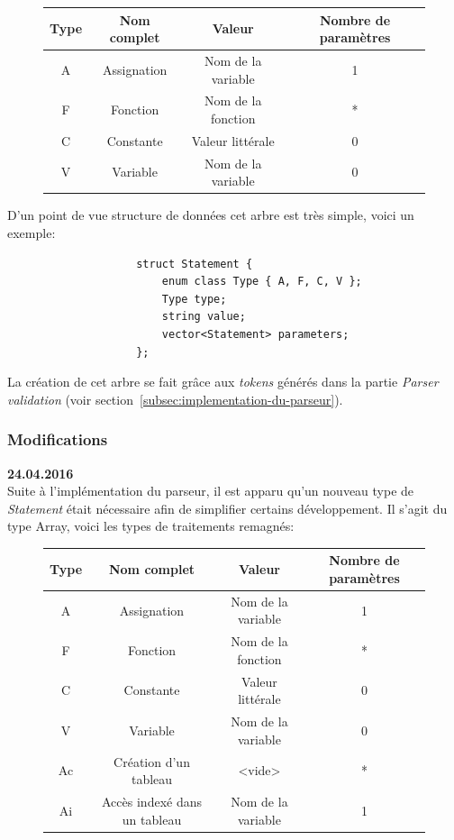 \documentclass[french]{article}
\begin{document}
			\begin{figure}[H]
				\centering
				\begin{tabular}{cccc}
					Type & Nom complet & Valeur & Nombre de paramètres\\
					\hline
					A & Assignation & Nom de la variable & 1\\
					F & Fonction & Nom de la fonction & *\\
					C & Constante & Valeur littérale & 0\\
					V & Variable & Nom de la variable & 0\\
				\end{tabular}
			\end{figure}
			
			D'un point de vue structure de données cet arbre est très simple, voici un exemple:
			
			\begin{lstlisting}
					struct Statement {
						enum class Type { A, F, C, V };
						Type type;
						string value;
						vector<Statement> parameters;
					};
			\end{lstlisting}
			
			La création de cet arbre se fait grâce aux \textit{tokens} générés dans la partie \textit{Parser validation} (voir section~\ref{subsec:implementation-du-parseur}).
			
			\subsubsection{Modifications}
				\textbf{24.04.2016}\\
				Suite à l'implémentation du parseur, il est apparu qu'un nouveau type de \textit{Statement} était nécessaire afin de simplifier certains développement. Il s'agit du type Array, voici les types de traitements remagnés:
				
				\begin{figure}[H]
					\centering
					\begin{tabular}{cccc}
						Type & Nom complet & Valeur & Nombre de paramètres\\
						\hline
						A & Assignation & Nom de la variable & 1\\
						F & Fonction & Nom de la fonction & *\\
						C & Constante & Valeur littérale & 0\\
						V & Variable & Nom de la variable & 0\\
						Ac & Création d'un tableau & <vide> & *\\
						Ai & Accès indexé dans un tableau & Nom de la variable & 1\\
					\end{tabular}
				\end{figure}
			
\end{document}
